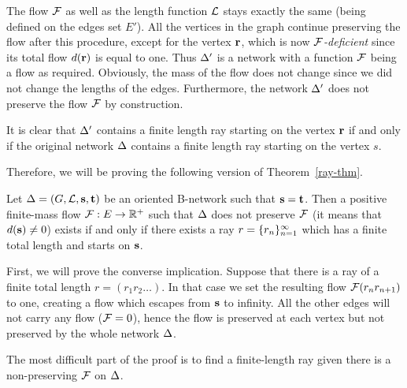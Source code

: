\documentclass[12pt,oneside,a4paper]{amsart}
\begin{document}
      The flow $\mathcal{F}$ as well as the length function $\mathcal{L}$ stays exactly the same (being defined on the edges set $E'$).
      All the vertices in the graph continue preserving the flow after this procedure, except for the vertex $\mathbf{r}$,
        which is now \emph{$\mathcal{F}$-deficient} since its total flow $d(\mathbf{r})$ is equal to one.
      Thus $\Delta'$ is a network with a function $\mathcal{F}$ being a flow as required.
      Obviously, the mass of the flow does not change since we did not change the lengths of the edges.
      Furthermore, the network $\Delta'$ does not preserve the flow $\mathcal{F}$ by construction.

      It is clear that $\Delta'$ contains a finite length ray starting on the vertex $\mathbf{r}$ if and only if the original network $\Delta$ contains a finite
        length ray starting on the vertex $s$.

      Therefore, we will be proving the following version of Theorem~\ref{ray-thm}.
      \begin{theorem}
        \label{ray-thm-reformulation}
        Let $\Delta = (G, \mathcal{L}, \mathbf{s}, \mathbf{t})$ be an oriented B-network such that $\mathbf{s} = \mathbf{t}$.
        Then a positive finite-mass flow $\mathcal{F}: E \to \mathbb{R}^{+}$ such that
          $\Delta$ does not preserve $\mathcal{F}$ (it means that $d(\mathbf{s}) \neq 0$)
          exists if and only if there exists a ray $r = \{{r}_n\}_{n=1}^\infty$
          which has a finite total length and starts on $\mathbf{s}$.
      \end{theorem}
      First, we will prove the converse implication.
      Suppose that there is a ray of a finite total length $r=(r_1 r_2 \dots)$.
      In that case we set the resulting flow $\mathcal{F}(r_n r_{n+1})$ to one, creating a flow which escapes
        from $\mathbf{s}$ to infinity.
      All the other edges will not carry any flow ($\mathcal{F} = 0$), hence the flow is preserved
        at each vertex but not preserved by the whole network $\Delta$.

      The most difficult part of the proof is to find a finite-length ray
        given there is a non-preserving $\mathcal{F}$ on $\Delta$.
      \smallskip
\end{document}
